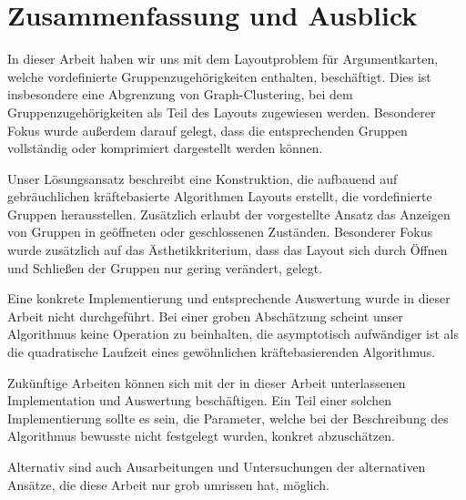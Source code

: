 \chapter{Zusammenfassung und Ausblick}
\label{ch:zsf}

In dieser Arbeit haben wir uns mit dem Layoutproblem für Argumentkarten, welche vordefinierte Gruppenzugehörigkeiten enthalten, beschäftigt. Dies ist insbesondere eine Abgrenzung von Graph-Clustering, bei dem Gruppenzugehörigkeiten als Teil des Layouts zugewiesen werden. Besonderer Fokus wurde außerdem darauf gelegt, dass die entsprechenden Gruppen vollständig oder komprimiert dargestellt werden können.

Unser Lösungsansatz beschreibt eine Konstruktion, die aufbauend auf gebräuchlichen kräftebasierte Algorithmen Layouts erstellt, die vordefinierte Gruppen herausstellen. Zusätzlich erlaubt der vorgestellte Ansatz das Anzeigen von Gruppen in geöffneten oder geschlossenen Zuständen. Besonderer Fokus wurde zusätzlich auf das Ästhetikkriterium, dass das Layout sich durch Öffnen und Schließen der Gruppen nur gering verändert, gelegt.

Eine konkrete Implementierung und entsprechende Auswertung wurde in dieser Arbeit nicht durchgeführt.
Bei einer groben Abschätzung scheint unser Algorithmus keine Operation zu beinhalten, die asymptotisch aufwändiger ist als die quadratische Laufzeit eines gewöhnlichen kräftebasierenden Algorithmus.

Zukünftige Arbeiten können sich mit der in dieser Arbeit unterlassenen Implementation und Auswertung beschäftigen. Ein Teil einer solchen Implementierung sollte es sein, die Parameter, welche bei der Beschreibung des Algorithmus bewusste nicht festgelegt wurden, konkret abzuschätzen.

Alternativ sind auch Ausarbeitungen und Untersuchungen der alternativen Ansätze, die diese Arbeit nur grob umrissen hat, möglich.

